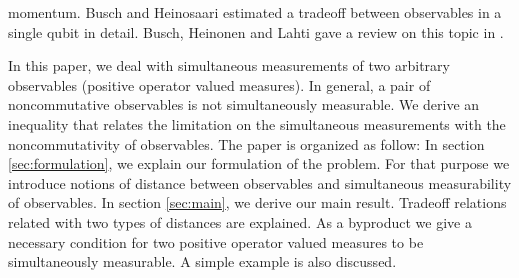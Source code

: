 \documentclass[showpacs,preprintnumbers,amsmath,amssymb]{revtex4}
\begin{document}
 momentum. Busch and Heinosaari \cite{Heinosaari} estimated a tradeoff
 between observables in a single qubit in detail. 
 Busch, Heinonen and Lahti gave a review on this topic in \cite{BHL}.
  \par
  In this paper, we deal with simultaneous measurements 
  of two arbitrary observables (positive operator valued measures). 
 In general, a pair of noncommutative observables 
 is not simultaneously measurable. 
 We derive an inequality that relates the limitation on 
 the simultaneous measurements with the noncommutativity
 of observables. 
 The paper is organized as follow:
 In section \ref{sec:formulation}, we 
 explain our formulation of the problem. 
 For that purpose we  introduce
  notions of distance between 
 observables and simultaneous measurability of 
 observables. 
 In section \ref{sec:main}, we derive our main 
 result. Tradeoff relations related with 
 two types of distances are explained. 
 As a byproduct we give a necessary condition for 
 two positive operator valued measures to be 
 simultaneously measurable. 
 A simple example is also discussed. 
\end{document}
